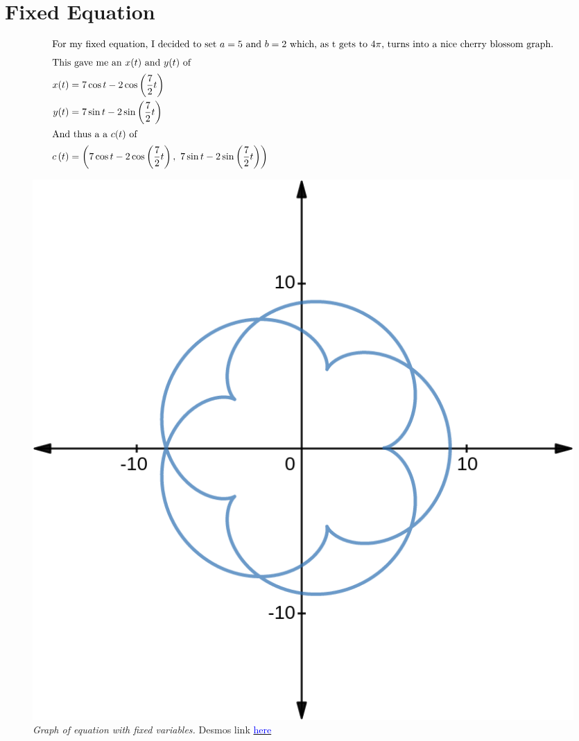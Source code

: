 \documentclass[12pt]{article}
\begin{document}
\section{Fixed Equation}
\begin{align*}
  \intertext{For my fixed equation, I decided to set $a=5$ and $b=2$ which, as t gets to $4\pi$, turns into a nice cherry blossom graph.}
  \intertext{This gave me an $x(t)$ and $y(t)$ of }
  x(t)            & =7\cos t-2\cos\left(\frac{7}{2}t\right)                                                       \\
  y(t)            & =7\sin t-2\sin\left(\frac{7}{2}t\right)                                                       \\
  \intertext{And thus a a $c(t)$ of}
  c\left(t\right) & =\left(7\cos t-2\cos\left(\frac{7}{2}t\right),\ 7\sin t-2\sin\left(\frac{7}{2}t\right)\right) \\
\end{align*}
\begin{figure}[H]
  \begin{center}
    \includegraphics[scale=.3]{base.png}
    \caption{\textit{Graph of equation with fixed variables.} Desmos link \href{https://www.desmos.com/calculator/lz7drdxhpy}{\textcolor{blue}{here}}}
  \end{center}
\end{figure}
\end{document}
